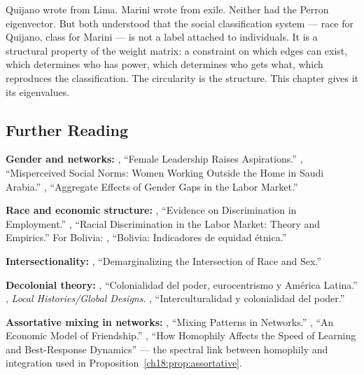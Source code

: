 \documentclass[../structural_economics_book.tex]{subfiles}
\begin{document}
Quijano wrote from Lima. Marini wrote from exile. Neither had the Perron eigenvector. But both understood that the social classification system --- race for Quijano, class for Marini --- is not a label attached to individuals. It is a structural property of the weight matrix: a constraint on which edges can exist, which determines who has power, which determines who gets what, which reproduces the classification. The circularity is the structure. This chapter gives it its eigenvalues.


\subsection*{Further Reading}

\textbf{Gender and networks:} \citet{beaman2012female}, ``Female Leadership Raises Aspirations.'' \citet{bursztyn2020misperceived}, ``Misperceived Social Norms: Women Working Outside the Home in Saudi Arabia.'' \citet{cuberes2016aggregate}, ``Aggregate Effects of Gender Gaps in the Labor Market.''

\textbf{Race and economic structure:} \citet{darity1998evidence}, ``Evidence on Discrimination in Employment.'' \citet{lang2012racial}, ``Racial Discrimination in the Labor Market: Theory and Empirics.'' For Bolivia: \citet*{jimenezpozo2006bolivia}, ``Bolivia: Indicadores de equidad \'{e}tnica.''

\textbf{Intersectionality:} \citet{crenshaw1989demarginalizing}, ``Demarginalizing the Intersection of Race and Sex.''

\textbf{Decolonial theory:} \citet{quijano2000colonialidad}, ``Colonialidad del poder, eurocentrismo y Am\'{e}rica Latina.'' \citet{mignolo2000local}, \textit{Local Histories/Global Designs}. \citet{walsh2007interculturalidad}, ``Interculturalidad y colonialidad del poder.''

\textbf{Assortative mixing in networks:} \citet{newman2003mixing}, ``Mixing Patterns in Networks.'' \citet*{currarini2009economic}, ``An Economic Model of Friendship.'' \citet{golub2012how}, ``How Homophily Affects the Speed of Learning and Best-Response Dynamics'' --- the spectral link between homophily and integration used in Proposition~\ref{ch18:prop:assortative}.
\end{document}
